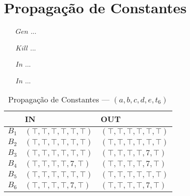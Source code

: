 \section{Propaga\c{c}\~ao de Constantes}

\begin{itemize}
  \item[$Gen$] ...
  \item[$Kill$] ...
  \item[$In$] ...
  \item[$In$] ...
\end{itemize}

\begin{table}[ht]
\centering
\begin{tabular}{l|l|l}
	& IN & OUT\\
\hline
$B_{1}$ &  $(\top,\top,\top,\top,\top,\top)$ & $(\top,\top,\top,\top,\top,\top)$\\
$B_{2}$ &  $(\top,\top,\top,\top,\top,\top)$ & $(\top,\top,\top,\top,\top,\top)$\\
$B_{3}$ &  $(\top,\top,\top,\top,\top,\top)$ & $(\top,\top,\top,\top,7,\top)$\\
$B_{4}$ &  $(\top,\top,\top,\top,7,\top)$ & $(\top,\top,\top,\top,7,\top)$\\
$B_{5}$ &  $(\top,\top,\top,\top,\top,\top)$ & $(\top,\top,\top,\top,\top,\top)$\\
$B_{6}$ &  $(\top,\top,\top,\top,7,\top)$ & $(\top,\top,\top,\top,7,\top)$\\
\end{tabular}
\caption{Propaga\c{c}\~ao de Constantes --- $(a, b, c, d, e, t_{6})$}
\end{table}

